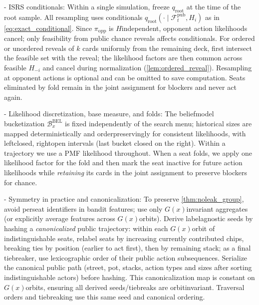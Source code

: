\documentclass[10pt]{article}
\newcommand{\1}{\mathbf{1}}
\theoremstyle{plain}
\begin{document}
- IS\textendash RS conditionals: Within a single simulation, freeze $q_{\mathrm{root}}$ at the time of the root sample. All resampling uses conditionals $q_{\mathrm{root}}(\cdot\mid \mathcal{F}^{\mathrm{pub}}_t,H_i)$ as in \eqref{eq:exact_conditional}. Since $\pi_{\mathrm{opp}}$ is $H$\textendash independent, opponent action likelihoods cancel; only feasibility from public chance reveals affects conditionals. For ordered or unordered reveals of $k$ cards uniformly from the remaining deck, first intersect the feasible set with the reveal; the likelihood factors are then common across feasible $H_{-i}$ and cancel during normalization (\cref{lem:ordered_reveal}). Resampling at opponent actions is optional and can be omitted to save computation. Seats eliminated by fold remain in the joint assignment for blockers and never act again.

- Likelihood discretization, base measure, and folds: The belief\textendash model bucketization $\mathcal{B}^{\mathrm{BEL}}_x$ is fixed independently of the search menu; historical sizes are mapped deterministically and order\textendash preservingly for consistent likelihoods, with left\textendash closed, right\textendash open intervals (last bucket closed on the right). Within a trajectory we use a PMF likelihood throughout. When a seat folds, we apply one likelihood factor for the fold and then mark the seat inactive for future action likelihoods while \emph{retaining} its cards in the joint assignment to preserve blockers for chance.

- Symmetry in practice and canonicalization: To preserve \cref{thm:noleak_group}, avoid per\textendash seat identifiers in bandit features; use only $G(x)$\textendash invariant aggregates (or explicitly average features across $G(x)$\textendash orbits). Derive label\textendash agnostic seeds by hashing a \emph{canonicalized} public trajectory: within each $G(x)$\textendash orbit of indistinguishable seats, relabel seats by increasing currently contributed chips, breaking ties by position (earlier to act first), then by remaining stack; as a final tiebreaker, use lexicographic order of their public action subsequences. Serialize the canonical public path (street, pot, stacks, action types and sizes after sorting indistinguishable actors) before hashing. This canonicalization map is constant on $G(x)$\textendash orbits, ensuring all derived seeds/tie\textendash breaks are orbit\textendash invariant. Traversal orders and tie\textendash breaking use this same seed and canonical ordering.
\end{document}
